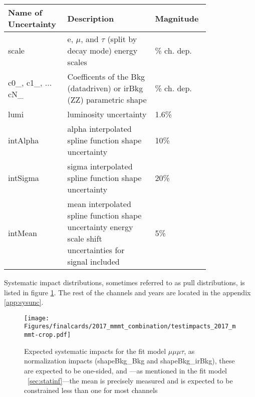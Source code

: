\begin{table}[h!tb]
\centering
{}
\begin{tabular}{|p{0.2\linewidth}|p{0.4\linewidth}|p{0.2\linewidth}|}
\hline  
Name of Uncertainty & Description & Magnitude\\\hline
scale &  e, $\mu$, and $\tau$ (split by decay mode) energy scales & \% ch. dep. \\\hline
 c0\_, c1\_, ... cN\_& Coefficents of the Bkg (datadriven) or irBkg (ZZ) parametric shape & \% ch. dep. \\\hline
lumi & luminosity uncertainty & 1.6\%  \\\hline
intAlpha & alpha interpolated spline function shape uncertainty & 10\% \\\hline
intSigma & sigma interpolated spline function shape uncertainty & 20\% \\\hline
intMean & mean interpolated spline function shape uncertainty energy scale shift uncertainties for signal included & 5\% \\\hline
\end{tabular}
\end{table}
\clearpage 

Systematic impact distributions, sometimes referred to as pull distributions, is listed in figure \ref{fig:impacts_2017_mmmt}. The rest of the channels and years are located in the appendix \ref{app:sysunc}.

\begin{figure}[ht!b]
    \centering 
\texttt{[image: Figures/finalcards/2017\_mmmt\_combination/testimpacts\_2017\_mmmt-crop.pdf]}
    \caption{\label{fig:impacts_2017_mmmt} Expected systematic impacts for the fit model $\mu\mu\mu\tau$, as normalization impacts (shapeBkg\_Bkg and shapeBkg\_irBkg), these are expected to be one-sided, and ---as mentioned in the fit model ~\ref{sec:statinf}---the mean is precisely measured and is expected to be constrained less than one for most channels }
\end{figure}




